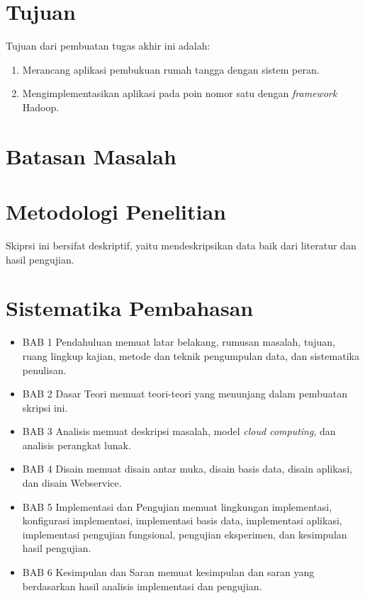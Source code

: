 \section{Tujuan}
\label{sec:tujuan}

Tujuan dari pembuatan tugas akhir ini adalah:
\begin{enumerate}
\item Merancang aplikasi pembukuan rumah tangga dengan sistem peran.
\item Mengimplementasikan aplikasi pada poin nomor satu dengan \textit{framework} Hadoop.
\end{enumerate}

\section{Batasan Masalah}
\label{sec:batasanmasalah}

\section{Metodologi Penelitian}
\label{sec:metodologipenelitian}

Skiprsi ini bersifat deskriptif, yaitu mendeskripsikan data baik dari literatur dan hasil pengujian.

\section{Sistematika Pembahasan}
\label{sec:sistematikapembahasan}

\begin{itemize}
	\item BAB 1 Pendahuluan memuat latar belakang, rumusan masalah, tujuan, ruang lingkup kajian, metode dan teknik pengumpulan data, dan sistematika penulisan.
	\item BAB 2 Dasar Teori memuat teori-teori yang menunjang dalam pembuatan skripsi ini.
	\item BAB 3 Analisis memuat deskripsi masalah, model \textit{cloud computing}, dan analisis perangkat lunak.
	\item BAB 4 Disain memuat disain antar muka, disain basis data, disain aplikasi, dan disain Webservice.
	\item BAB 5 Implementasi dan Pengujian memuat lingkungan implementasi, konfigurasi implementasi, implementasi basis data, implementasi aplikasi, implementasi pengujian fungsional, pengujian eksperimen, dan kesimpulan hasil pengujian.
	\item BAB 6 Kesimpulan dan Saran memuat kesimpulan dan saran yang berdasarkan hasil analisis implementasi dan pengujian.
\end{itemize}

